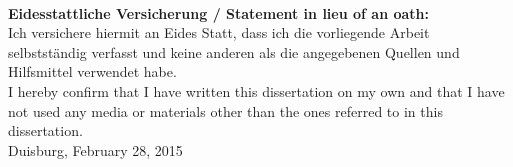%
%

\clearpage
\thispagestyle{empty}
~
\begin{flushleft}
  \textbf{Eidesstattliche Versicherung / Statement in lieu of an oath:}\\
  Ich versichere hiermit an Eides Statt, dass ich die vorliegende
  Arbeit selbstst\"andig verfasst und keine anderen als die angegebenen
  Quellen und Hilfsmittel verwendet habe.\\

  I hereby confirm that I have written this dissertation on my own
  and that I have not used any media or materials other than the ones
  referred to in this dissertation.\\[\baselineskip]

	Duisburg, February 28, 2015\\

\end{flushleft}
